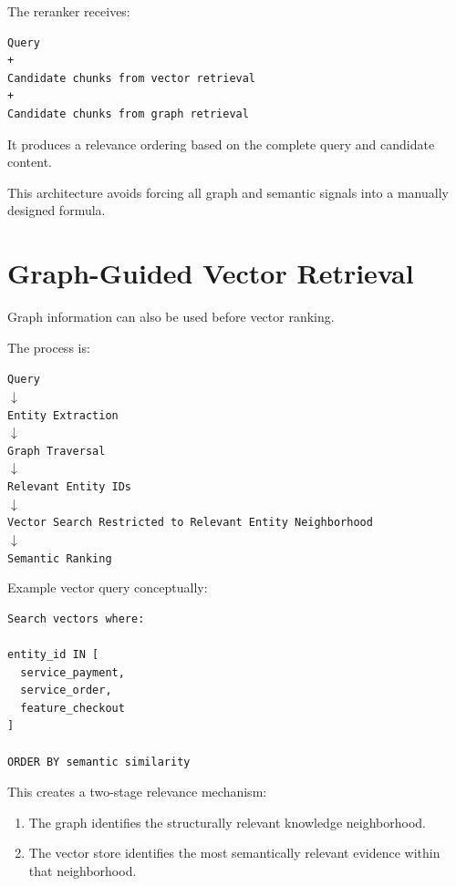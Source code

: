 \documentclass[11pt,a4paper]{article}
\begin{document}
The reranker receives:

\begin{lstlisting}
Query
+
Candidate chunks from vector retrieval
+
Candidate chunks from graph retrieval
\end{lstlisting}

It produces a relevance ordering based on the complete query and candidate content.

This architecture avoids forcing all graph and semantic signals into a manually designed formula.

\section{Graph-Guided Vector Retrieval}

Graph information can also be used before vector ranking.

The process is:

\begin{center}
\texttt{Query}\\
$\downarrow$\\
\texttt{Entity Extraction}\\
$\downarrow$\\
\texttt{Graph Traversal}\\
$\downarrow$\\
\texttt{Relevant Entity IDs}\\
$\downarrow$\\
\texttt{Vector Search Restricted to Relevant Entity Neighborhood}\\
$\downarrow$\\
\texttt{Semantic Ranking}
\end{center}

Example vector query conceptually:

\begin{lstlisting}
Search vectors where:

entity_id IN [
  service_payment,
  service_order,
  feature_checkout
]

ORDER BY semantic similarity
\end{lstlisting}

This creates a two-stage relevance mechanism:

\begin{enumerate}
\item The graph identifies the structurally relevant knowledge neighborhood.
\item The vector store identifies the most semantically relevant evidence within that neighborhood.
\end{enumerate}
\end{document}
